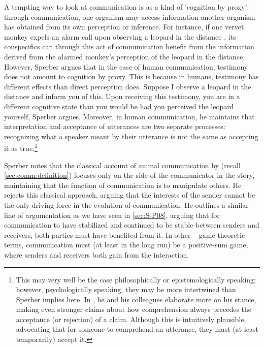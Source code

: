 A tempting way to look at communication is as a kind of 'cognition by proxy': through communication, one organism may access information another organism has obtained from its own perception or inference.
For instance, if one vervet monkey expels an alarm call upon observing a leopard in the distance \citep{Seyfarth80}, its conspecifics can through this act of communication benefit from the information derived from the alarmed monkey's perception of the leopard in the distance.
However, Sperber argues that in the case of human communication, testimony does not amount to cognition by proxy. This is because in humans, testimony has different effects than direct perception does. Suppose I observe a leopard in the distance and inform you of this. Upon receiving this testimony, you are in a different cognitive state than you would be had you perceived the leopard yourself, Sperber argues. Moreover, in human communication, he maintains that interpretation and acceptance of utterances are two separate processes: recognizing what a speaker meant by their utterance is not the same as accepting it as true.\footnote{This may very well be the case philosophically or epistemologically speaking; however, psychologically speaking, they may be more intertwined than Sperber implies here. In \citet[\S 3]{Sperber10}, he and his colleagues elaborate more on his stance, making even stronger claims about how comprehension always precedes the acceptance (or rejection) of a claim. Although this is intuitively plausible, \citet[cf.][]{Gilbert91} advocating that for someone to comprehend an utterance, they must (at least temporarily) accept it.}

Sperber notes that the classical account of animal communication by \citet{DawkinsKrebs78} (recall \cref{sec:comm:definition}) focuses only on the side of the communicator in the story, maintaining that the function of communication is to manipulate others. He rejects this classical approach, arguing that the interests of the sender cannot be the only driving force in the evolution of communication.
He outlines a similar line of argumentation as we have seen in \cref{sec:S-P08},
arguing that for communication to have stabilized and continued to be stable between senders and receivers, both parties must have benefited from it. In other -- game-theoretic -- terms, communication must (at least in the long run) be a positive-sum game, where senders and receivers both gain from the interaction.

